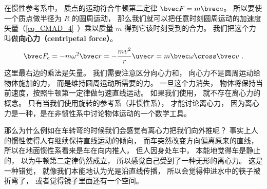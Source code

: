 

在惯性参考系中， 质点的运动符合牛顿第二定律 $\bvec F = m\bvec a$。 所以要使一个质点做半径为 $R$ 的圆周运动， 那么我们就可以把任意时刻圆周运动的加速度矢量（\autoref{eq_CMAD_4}~）乘以质量 $m$ 得到它该时刻受到的合力。 我们把这个力叫做\textbf{向心力（centripetal force）}。
\begin{equation}
\bvec F_c = -m \omega^2 \bvec r = -\frac{mv^2}{r}\uvec r = m\bvec \omega \cross \bvec v~.
\end{equation}
这里最右边的乘法是矢量。 我们需要注意区分向心力和， 向心力不是圆周运动给物体施加的力， 而是维持圆周运动所需要的力。 一旦这个力消失， 物体将保持当前速度，按照牛顿第一定律做匀速直线运动。 如果我们使用， 就不存在离心力的概念。 只有当我们使用旋转的参考系（非惯性系）， 才能讨论离心力， 因为离心力是一种，是在非惯性系中讨论物体运动的一个数学工具。

那么为什么例如在车转弯的时候我们会感觉有离心力把我们向外推呢？ 事实上人的惯性使得人有继续保持直线运动的倾向， 而车突然改变方向偏离原来的直线， 所以在地面惯性系看来是车在向内推人， 但人因身处车中， 本能地觉得车是静止的， 以为牛顿第二定律仍然成立， 所以感觉自己受到了一种无形的离心力。 这是一种错觉， 就像我们本能地认为光是沿直线传播， 所以会觉得伸进水中的筷子被折弯了， 或者觉得镜子里面还有一个空间。
